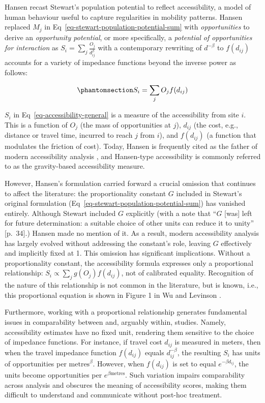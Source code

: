 \documentclass[
  10pt,
  letterpaper,
]{article}
\begin{document}
Hansen recast Stewart's population potential to reflect accessibility, a
model of human behaviour useful to capture regularities in mobility
patterns. Hansen replaced \(M_j\) in
Eq~\ref{eq-stewart-population-potential-sum} with \emph{opportunities}
to derive an \emph{opportunity potential}, or more specifically, a
\emph{potential of opportunities for interaction} as
\(S_{i} = \sum_j \frac{O_j }{d_{ij}^\beta}\) with a contemporary
rewriting of \(d^{-\beta}\) to \(f(d_{ij})\) accounts for a variety of
impedance functions beyond the inverse power as follows:

\begin{equation}\phantomsection\label{eq-accessibility-general}{
S_{i} = \sum_j O_j  f(d_{ij})
}\end{equation}

\(S_{i}\) in Eq~\ref{eq-accessibility-general} is a measure of the
accessibility from site \(i\). This is a function of \(O_j\) (the mass
of opportunities at \(j\)), \(d_{ij}\) (the cost, e.g., distance or
travel time, incurred to reach \(j\) from \(i\)), and \(f(d_{ij})\) (a
function that modulates the friction of cost). Today, Hansen is
frequently cited as the father of modern accessibility analysis
\citep[e.g.,][]{reggianiGuestEditorialNew2011}, and Hansen-type
accessibility is commonly referred to as the gravity-based accessibility
measure.

However, Hansen's formulation carried forward a crucial omission that
continues to affect the literature: the proportionality constant \(G\)
included in Stewart's original formulation
(Eq~\ref{eq-stewart-population-potential-sum}) has vanished entirely.
Although Stewart included \(G\) explicitly (with a note that ``\(G\)
{[}was{]} left for future determination: a suitable choice of other
units can reduce it to unity'' {[}p.~34{]}.) Hansen made no mention of
it. As a result, modern accessibility analysis has largely evolved
without addressing the constant's role, leaving \(G\) effectively and
implicitly fixed at 1. This omission has significant implications.
Without a proportionality constant, the accessibility formula expresses
only a proportional relationship:
\(S_i \propto \sum_j g(O_j)f(d_{ij})\), not of calibrated equality.
Recognition of the nature of this relationship is not common in the
literature, but is known, i.e., this proportional equation is shown in
Figure 1 in Wu and Levinson \citep{wuUnifyingAccess2020}.

Furthermore, working with a proportional relationship generates
fundamental issues in comparability between and, arguably within,
studies. Namely, accessibility estimates have no fixed unit, rendering
them sensitive to the choice of impedance functions. For instance, if
travel cost \(d_{ij}\) is measured in meters, then when the travel
impedance function \(f(d_{ij})\) equals \(d_{ij}^{-\beta}\), the
resulting \(S_i\) has units of opportunities per
\(\text{metres}^{\beta}\). However, when \(f(d_{ij})\) is set to equal
\(e^{-\beta d_{ij}}\), the units become opportunities per
\(e^{\beta \text{metres}}\). Such variation impairs comparability across
analysis and obscures the meaning of accessibility scores, making them
difficult to understand and communicate without post-hoc treatment.
\end{document}
